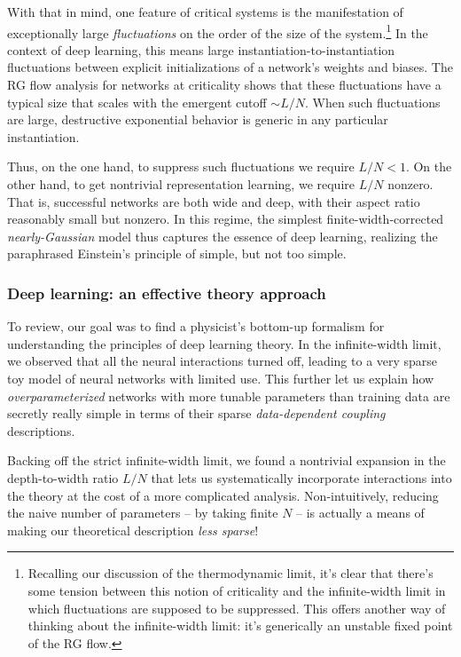 \documentclass[12pt]{article}
\begin{document}
With that in mind, one feature of critical systems is the manifestation of exceptionally large \emph{fluctuations} on the order of the size of the system.\footnote{
     Recalling our discussion of the thermodynamic limit, it's clear that there's some tension between this notion of criticality and the infinite-width limit in which  fluctuations are supposed to be suppressed. This offers another way of thinking about the infinite-width limit: it's generically an unstable fixed point of the RG flow.
}  In the context of deep learning, this means large instantiation-to-instantiation fluctuations between explicit initializations of a network's weights and biases. The RG flow analysis for networks at criticality shows that these fluctuations have a typical size that scales with the emergent cutoff $\sim L/N$. When such fluctuations are large, destructive exponential behavior is generic in any particular instantiation. 


Thus, on the one hand, to suppress such fluctuations we require $L/N < 1$. On the other hand, to get nontrivial representation learning, we require $L/N$ nonzero. That is, successful networks are both wide and deep, with their aspect ratio reasonably small but nonzero. In this regime, the simplest finite-width-corrected \emph{nearly-Gaussian} model thus captures the essence of deep learning, realizing the paraphrased Einstein's principle of simple, but not too simple.












\subsubsection*{Deep learning: an effective theory approach}


To review, our goal was to find a physicist's bottom-up formalism for understanding the principles of deep learning theory. In the infinite-width limit, we observed that all the neural interactions turned off, leading to a very sparse toy model of neural networks with limited use. This further let us explain how \emph{overparameterized} networks with more tunable parameters than training data are secretly really simple in terms of their sparse \emph{data-dependent coupling} descriptions.



Backing off the strict infinite-width limit, we found a nontrivial expansion in the depth-to-width ratio $L/N$ that lets us systematically incorporate interactions into the theory at the cost of a more complicated analysis. Non-intuitively, reducing the naive number of parameters -- by taking finite $N$ %
 -- is actually a means of making our theoretical description \emph{less sparse}!
\end{document}
